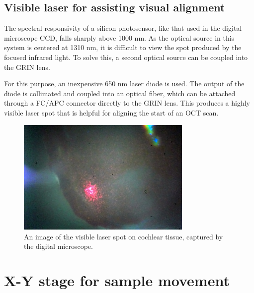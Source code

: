 \subsection{Visible laser for assisting visual alignment}


The spectral responsivity of a silicon photosensor, like that used in the digital microscope CCD, falls sharply above 1000 nm. As the optical source in this system is centered at 1310 nm, it is difficult to view the spot produced by the focused infrared light. To solve this, a second optical source can be coupled into the GRIN lens.

For this purpose, an inexpensive 650 nm laser diode is used. The output of the diode is collimated and coupled into an optical fiber, which can be attached through a FC/APC connector directly to the GRIN lens. This produces a highly visible laser spot that is helpful for aligning the start of an OCT scan.

\begin{figure}[h!]
\centering
\includegraphics[width=0.75\textwidth]{Images/System/alignment_laser.jpg}
\caption[An image of the visible laser spot on cochlear tissue.]{An image of the visible laser spot on cochlear tissue, captured by the digital microscope.}
\end{figure}


\section{X-Y stage for sample movement}

